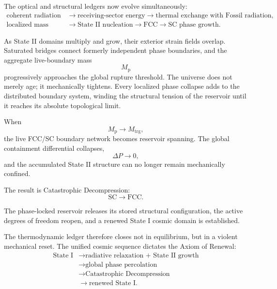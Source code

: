 The optical and structural ledgers now evolve simultaneously:
\begin{equation}
\begin{aligned}
    \text{coherent radiation}
    &\longrightarrow
    \text{receiving-sector energy}
    \longrightarrow
    \text{thermal exchange with Fossil radiation},
    \\
    \text{localized mass loading}
    &\longrightarrow
    \text{State II nucleation}
    \longrightarrow
    \text{FCC}\rightarrow\text{SC phase growth}.
\end{aligned}
\end{equation}

As State II domains multiply and grow, their exterior strain fields overlap. Saturated bridges connect formerly independent phase boundaries, and the aggregate live-boundary mass
\begin{equation}
    M_{\mathrm p}
\end{equation}
progressively approaches the global rupture threshold.
The universe does not merely age; it mechanically tightens. Every localized phase collapse adds to the distributed boundary system, winding the structural tension of the reservoir until it reaches its absolute topological limit.

When
\begin{equation}
    M_{\mathrm p}
    \rightarrow
    M_{\mathrm{trg}},
\end{equation}
the live FCC/SC boundary network becomes reservoir spanning. The global containment differential collapses,
\begin{equation}
    \Delta P
    \rightarrow
    0,
\end{equation}
and the accumulated State II structure can no longer remain mechanically confined.

The result is Catastrophic Decompression:
\begin{equation}
    \mathrm{SC}
    \longrightarrow
    \mathrm{FCC}.
\end{equation}

The phase-locked reservoir releases its stored structural configuration, the active degrees of freedom reopen, and a renewed State I cosmic domain is established.

The thermodynamic ledger therefore closes not in equilibrium, but in a violent mechanical reset. The unified cosmic sequence dictates the Axiom of Renewal:
\begin{equation}
\begin{aligned}
    \text{State I}
    &\longrightarrow
    \text{radiative relaxation + State II growth}
    \\
    &\longrightarrow
    \text{global phase percolation}
    \\
    &\longrightarrow
    \text{Catastrophic Decompression}
    \\
    &\longrightarrow
    \text{renewed State I}.
\end{aligned}
\end{equation}

